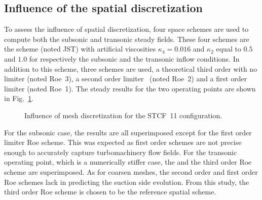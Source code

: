 \subsection{Influence of the spatial discretization}
To assess the influence of spatial discretization, four space schemes are
used to compute both the subsonic and transonic steady fields. These
four schemes are the \citet{Jameson1981} scheme (noted JST) with artificial
viscosities $\kappa_4 = 0.016$
and $\kappa_2$ equal to $0.5$ and $1.0$ for respectively the subsonic and the transonic
inflow conditions. In addition to this scheme, three \citet{Roe1981} schemes are used,
a theoretical third order with no limiter (noted Roe~3), a second order limiter~\cite{Roe1981} (noted Roe~2)
and a first order limiter (noted Roe~1).
The steady results for the two operating points are shown 
in Fig.~\ref{fig:stcf11_space_scheme_convergence}.
\begin{figure}[htb!]
  \centering
  \caption{Influence of mesh discretization for the STCF~11 configuration.}
  \label{fig:stcf11_space_scheme_convergence}
\end{figure}
For the subsonic case, the results are all superimposed except for the first 
order limiter Roe scheme. This was expected as first order schemes
are not precise enough to accurately capture turbomachinery flow fields.
For the transonic operating point, which is a numerically stiffer case,
the \citet{Jameson1981} and the third order Roe scheme are superimposed.
As for coarsen meshes, the second order and first order Roe schemes
lack in predicting the suction side evolution. From this study,
the third order Roe scheme is chosen to be the reference spatial scheme.
